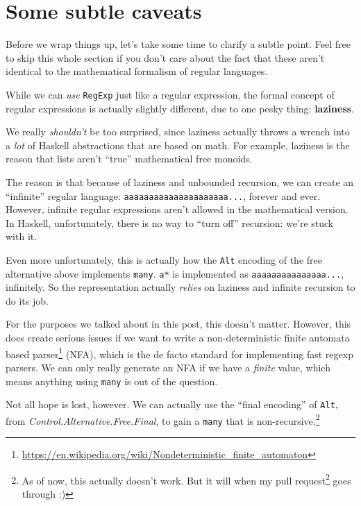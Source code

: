 \documentclass[]{article}
\renewcommand{\href}[2]{#2\footnote{\url{#1}}}
\begin{document}
\hypertarget{some-subtle-caveats}{%
\section{Some subtle caveats}\label{some-subtle-caveats}}

Before we wrap things up, let's take some time to clarify a subtle point. Feel
free to skip this whole section if you don't care about the fact that these
aren't identical to the mathematical formalism of regular languages.

While we can \emph{use} \texttt{RegExp} just like a regular expression, the
formal concept of regular expressions is actually slightly different, due to one
pesky thing: \textbf{laziness}.

We really \emph{shouldn't} be too surprised, since laziness actually throws a
wrench into a \emph{lot} of Haskell abstractions that are based on math. For
example, laziness is the reason that lists aren't ``true'' mathematical free
monoids.

The reason is that because of laziness and unbounded recursion, we can create an
``infinite'' regular language:
\texttt{a\textbar{}aa\textbar{}aaa\textbar{}aaaa\textbar{}aaaaa\textbar{}aaaaaa\textbar{}...},
forever and ever. However, infinite regular expressions aren't allowed in the
mathematical version. In Haskell, unfortunately, there is no way to ``turn off''
recursion: we're stuck with it.

Even more unfortunately, this is actually how the \texttt{Alt} encoding of the
free alternative above implements \texttt{many}. \texttt{a*} is implemented as
\texttt{\textbar{}a\textbar{}aa\textbar{}aaa\textbar{}aaaa\textbar{}aaaaa\textbar{}...},
infinitely. So the representation actually \emph{relies} on laziness and
infinite recursion to do its job.

For the purposes we talked about in this post, this doesn't matter. However,
this does create serious issues if we want to write a
\href{https://en.wikipedia.org/wiki/Nondeterministic_finite_automaton}{non-deterministic
finite automata based parser} (NFA), which is the de facto standard for
implementing fast regexp parsers. We can only really generate an NFA if we have
a \emph{finite} value, which means anything using \texttt{many} is out of the
question.

Not all hope is lost, however. We can actually use the ``final encoding'' of
\texttt{Alt}, from \emph{Control.Alternative.Free.Final}, to gain a
\texttt{many} that is non-recursive.\footnote{As of now, this actually doesn't
  work. But it will when my \href{https://github.com/ekmett/free/pull/188}{pull
  request} goes through :)}
\end{document}

